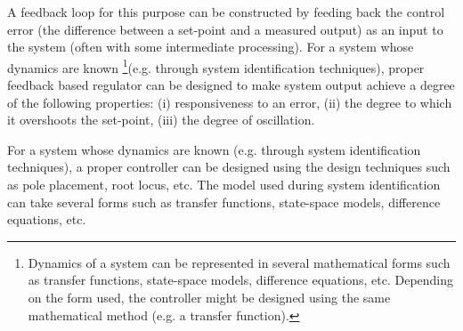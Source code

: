   A feedback loop for this purpose can be constructed by feeding back the control error (the difference between a set-point and a measured output) as an input to the system (often with some intermediate processing). 
For a system whose dynamics are known
\footnote{Dynamics of a system can be represented in several mathematical forms such as transfer functions, state-space models, difference equations, etc. Depending on the form used, the controller might be designed using the same mathematical method (e.g. a transfer function). }(e.g. through system identification techniques), proper feedback based regulator can be designed to make system output achieve a degree of the following properties:  
(i) responsiveness to an error, 
(ii) the degree to which it overshoots the set-point, 
(iii) the degree of oscillation. 
    
For a system whose dynamics are known (e.g. through system identification techniques), a proper controller can be designed using the design techniques such as pole placement, root locus, etc. The model used during system identification can take several forms such as transfer functions, state-space models, difference equations, etc.
 
%
%
